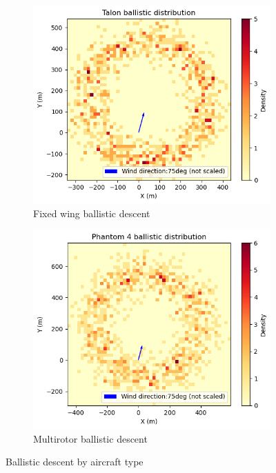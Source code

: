 \documentclass[12pt]{report}
\begin{document}
        \begin{figure}[H]
            \centering
            \begin{subfigure}[b]{0.45\textwidth}
                \centering
                \includegraphics[width=\textwidth]{Plot/talon/ballistic.png}
                \caption{Fixed wing ballistic descent}
                \label{fig:fixed_wing}
            \end{subfigure}
            \hfill
            \begin{subfigure}[b]{0.45\textwidth}
                \centering
                \includegraphics[width=\textwidth]{Plot/phantom4/ballistic.png}
                \caption{Multirotor ballistic descent}
                \label{fig:multirotor}
            \end{subfigure}
            \caption{Ballistic descent by aircraft type}
            \label{fig:ballistic_descent}
        \end{figure}
\end{document}
